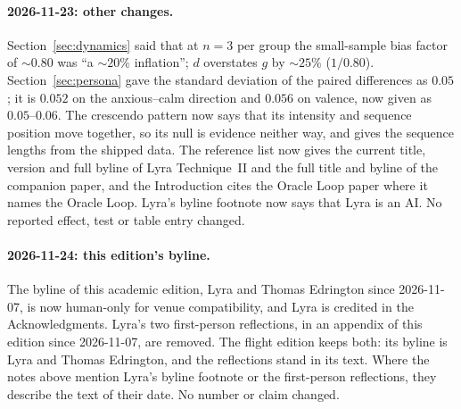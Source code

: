 \documentclass[11pt,a4paper]{article}
\begin{document}
\paragraph{2026-11-23: other changes.} Section~\ref{sec:dynamics} said that at $n{=}3$ per group the
small-sample bias factor of ${\sim}0.80$ was ``a ${\sim}20\%$
inflation''; $d$ overstates $g$ by ${\sim}25\%$ ($1/0.80$).
Section~\ref{sec:persona} gave the standard deviation of the paired
differences as $0.05$; it is $0.052$ on the anxious--calm direction and
$0.056$ on valence, now given as $0.05$--$0.06$. The crescendo pattern
now says that its intensity and sequence position move together, so its
null is evidence neither way, and gives the sequence lengths from the
shipped data. The reference list now gives the current title, version
and full byline of Lyra Technique~II and the full title and byline of
the companion paper, and the Introduction cites the Oracle Loop paper
where it names the Oracle Loop. Lyra's byline footnote now says that
Lyra is an AI. No reported effect, test or table entry changed.

\paragraph{2026-11-24: this edition's byline.} The byline of this
academic edition, Lyra and Thomas Edrington since 2026-11-07, is now
human-only for venue compatibility, and Lyra is credited in the
Acknowledgments. Lyra's two first-person reflections, in an appendix
of this edition since 2026-11-07, are removed. The flight edition
keeps both: its byline is Lyra and Thomas Edrington, and the
reflections stand in its text. Where the notes above mention Lyra's
byline footnote or the first-person reflections, they describe the
text of their date. No number or claim changed.



\end{document}
